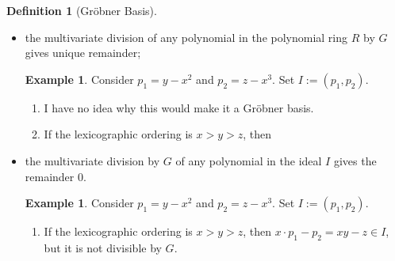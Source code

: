 \documentclass{book}
\theoremstyle{plain}
\theoremstyle{definition}
\newtheorem{exmp}[thm]{Example} %
\theoremstyle{custom_definition}
\newtheorem{defn}[thm]{Definition}
\begin{document}
\begin{defn}[Gröbner Basis]
\begin{itemize}
\begin{exmp}
\begin{enumerate}
            \item But if the lexicographic ordering is \(x > y > z\), then the leading polynomials in \(\{p_1, p_2\}\) are ... the same as above.
        \end{enumerate}
    \end{exmp}
    \item the multivariate division of any polynomial in the polynomial ring \(R\) by \(G\) gives unique remainder;
    \begin{exmp}
        Consider \(p_1 = y - x^2\) and \(p_2 = z - x^3\). Set \(I := (p_1, p_2)\).
        \begin{enumerate}
            \item I have no idea why this would make it a Gröbner basis.
            \item If the lexicographic ordering is \(x > y > z\), then 
        \end{enumerate}
    \end{exmp}
    \item the multivariate division by \(G\) of any polynomial in the ideal \(I\) gives the remainder \(0\).
    \begin{exmp}
        Consider \(p_1 = y - x^2\) and \(p_2 = z - x^3\). Set \(I := (p_1, p_2)\).
        \begin{enumerate}
            \item If the lexicographic ordering is \(x > y > z\), then \(x \cdot p_1 - p_2 = xy - z \in I\), but it is not divisible by \(G\).
        \end{enumerate}
    \end{exmp}
\end{itemize}
\end{defn}
\end{document}
